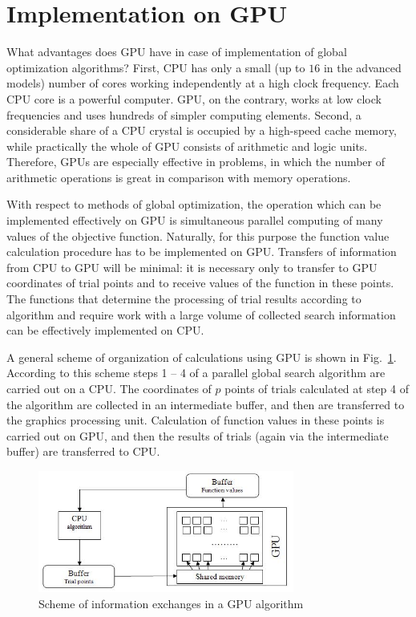 \documentclass[smallcondensed]{svjour3}     %
\begin{document}
\section{Implementation on GPU} \label{sec:5}

What advantages does GPU have in case of implementation of global optimization algorithms? First, CPU has only a small (up to $16$ in the advanced models) number of cores working independently at a high clock frequency. Each CPU core is a powerful computer. GPU, on the contrary, works at low clock frequencies and uses hundreds of simpler computing elements. Second, a considerable share of a CPU crystal is occupied by a high-speed cache memory, while practically the whole of GPU consists of arithmetic and logic units. Therefore, GPUs are especially effective in problems, in which the number of arithmetic operations is great in comparison with memory operations.

With respect to methods of global optimization, the operation which can be implemented effectively on GPU is simultaneous parallel computing of many values of the objective function. Naturally, for this purpose the function value calculation procedure has to be implemented on GPU. Transfers of information from CPU to GPU will be minimal: it is necessary only to transfer to GPU coordinates of trial points and to receive values of the function in these points. The functions that determine the processing of trial results according to algorithm and require work with a large volume of collected search information can be effectively implemented on CPU.

A general scheme of organization of calculations using GPU is shown in Fig.~\ref{fig:3}. According to this scheme steps 1 -- 4 of a parallel global search algorithm are carried out on a CPU. The coordinates of $p$ points of trials calculated at step 4 of the algorithm are collected in an intermediate buffer, and then are transferred to the graphics processing unit. Calculation of function values in these points is carried out on GPU, and then the results of trials (again via the intermediate buffer) are transferred to CPU.

\begin{figure}
	\center
  \includegraphics[width=0.75\textwidth]{fig3.jpg} 
  \caption{Scheme of information exchanges in a GPU algorithm}
  \label{fig:3}
\end{figure}
\end{document}
